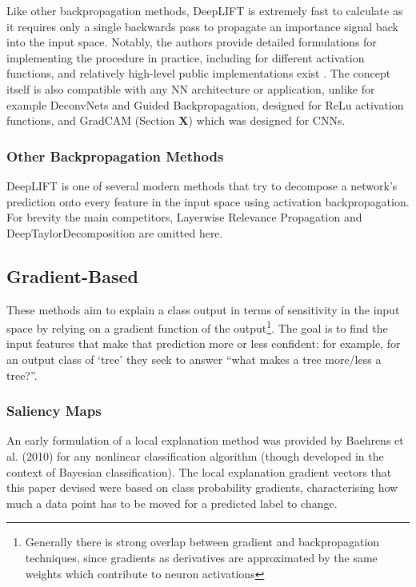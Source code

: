 \documentclass[main]{subfiles}
\begin{document}
Like other backpropagation methods, DeepLIFT is extremely fast to calculate as it requires only a single backwards pass to propagate an importance signal back into the input space. Notably, the authors provide detailed formulations for implementing the procedure in practice, including for different activation functions, and relatively high-level public implementations exist \cite{deepliftrepo}. The concept itself is also compatible with any NN architecture or application, unlike for example DeconvNets and Guided Backpropagation, designed for ReLu activation functions, and GradCAM (Section \textbf{X}) which was designed for CNNs.


\subsubsection{Other Backpropagation Methods}
DeepLIFT is one of several modern methods that try to decompose a network's prediction onto every feature in the input space using activation backpropagation. For brevity the main competitors, Layerwise Relevance Propagation \cite{lrp} and DeepTaylorDecomposition \cite{taylor} are omitted here.





\subsection{Gradient-Based} \label{sec:gradient}
These methods aim to explain a class output in terms of sensitivity in the input space by relying on a gradient function of the output\footnote{Generally there is strong overlap between gradient and backpropagation techniques, since gradients as derivatives are approximated by the same weights which contribute to neuron activations}. The goal is to find the input features that make that prediction more or less confident: for example, for an output class of `tree' they seek to answer ``what makes a tree more/less a tree?''.

\subsubsection{Saliency Maps}
An early formulation of a local explanation method was provided by Baehrens et al. (2010) for any nonlinear classification algorithm \cite{saliencyI} (though developed in the context of Bayesian classification). The local explanation gradient vectors that this paper devised were based on class probability gradients, characterising how much a data point has to be moved for a predicted label to change.
\end{document}
